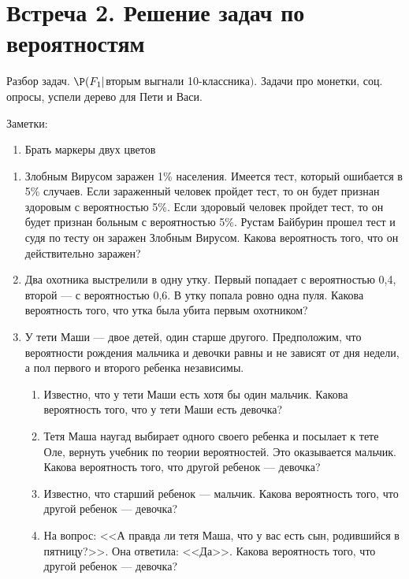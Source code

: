 \documentclass[pdftex,12pt,a4paper]{article}
\begin{document}
\section{Встреча 2. Решение задач по вероятностям}

Разбор задач. $\P(F_1|$вторым выгнали 10-классника$)$. Задачи про монетки, соц. опросы, успели дерево для Пети и Васи.


Заметки:
\begin{enumerate}
\item Брать маркеры двух цветов
\end{enumerate}

\begin{enumerate}
\item Злобным Вирусом заражен 1\% населения. Имеется тест, который ошибается в 5\% случаев. Если зараженный человек пройдет тест, то он будет признан здоровым с вероятностью 5\%. Если здоровый человек пройдет тест, то он будет признан больным с вероятностью 5\%. Рустам Байбурин прошел тест и судя по тесту он заражен Злобным Вирусом. Какова вероятность того, что он действительно заражен?



\item Два охотника выстрелили в одну утку. Первый попадает с
вероятностью 0,4, второй --- с вероятностью 0,6. В утку попала ровно
одна пуля. Какова вероятность того, что утка была убита первым
охотником?


\item У тети Маши --- двое детей, один старше другого. Предположим, что вероятности рождения мальчика и девочки равны и не зависят от дня недели, а пол первого и второго ребенка независимы. \\
\begin{enumerate}
\item Известно, что у тети Маши есть хотя бы один мальчик. Какова
вероятность того, что у тети Маши есть девочка? 
\item Тетя Маша наугад выбирает одного своего
ребенка и посылает к тете Оле, вернуть учебник по теории
вероятностей. Это оказывается мальчик. Какова вероятность того,
что другой ребенок --- девочка? 
\item Известно, что старший ребенок --- мальчик. Какова вероятность того, что другой ребенок --- девочка? 
\item На вопрос: <<А правда ли тетя Маша, что у вас есть сын, родившийся в пятницу?>>. Она ответила: <<Да>>. Какова вероятность того, что другой ребенок --- девочка?
\end{enumerate}



\end{enumerate}
\end{document}
